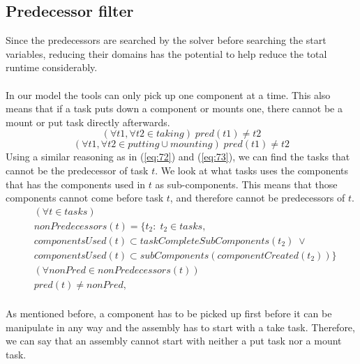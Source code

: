   
  
  \subsection{Predecessor filter}
  Since the predecessors are searched by the solver before searching the start variables, reducing their domains has the potential to help reduce the total runtime considerably.
 \\\\
  In our model the tools can only pick up one component at a time. This also means that if a task puts down a component or mounts one, there cannot be a mount or put task directly afterwards.
  \begin{equation}\label{eq:75}
  (\forall t1, \forall t2 \in taking) \; pred(t1) \neq t2
  \end{equation}
  \begin{equation}\label{eq:76}
  (\forall t1, \forall t2 \in putting \cup mounting) \; pred(t1) \neq t2
  \end{equation}
\newpage
   \noindent Using a similar reasoning as in (\ref{eq:72}) and (\ref{eq:73}), we can find the tasks that cannot be the predecessor of task $t$. We look at what tasks uses the components that has the components used in $t$ as sub-components. This means that those components cannot come before task $t$, and therefore cannot be predecessors of $t$.
  \begin{equation}
  \begin{aligned}\label{eq:78}
  &(\forall t \in tasks)\\
  &nonPredecessors(t) = \{t_2 : \; t_2 \in tasks, \\
  &componentsUsed(t) \subset taskCompleteSubComponents(t_2) \; \lor \\
  &componentsUsed(t) \subset subComponents(componentCreated(t_2))\} \\
  &(\forall nonPred \in nonPredecessors(t)) \\
  &pred(t) \neq nonPred, \\
  \end{aligned}
  \end{equation}

   \noindent As mentioned before, a component has to be picked up first before it can be manipulate in any way and the assembly has to start with a take task. Therefore, we can say that an assembly cannot start with neither a put task nor a mount task.
    

